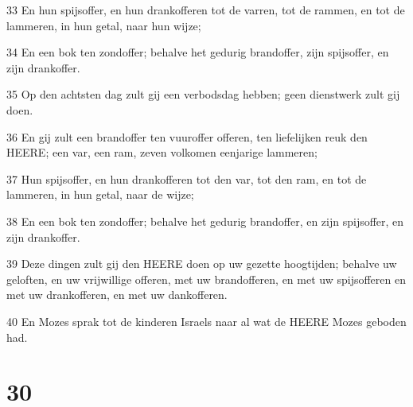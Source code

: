 \par 33 En hun spijsoffer, en hun drankofferen tot de varren, tot de rammen, en tot de lammeren, in hun getal, naar hun wijze;
\par 34 En een bok ten zondoffer; behalve het gedurig brandoffer, zijn spijsoffer, en zijn drankoffer.
\par 35 Op den achtsten dag zult gij een verbodsdag hebben; geen dienstwerk zult gij doen.
\par 36 En gij zult een brandoffer ten vuuroffer offeren, ten liefelijken reuk den HEERE; een var, een ram, zeven volkomen eenjarige lammeren;
\par 37 Hun spijsoffer, en hun drankofferen tot den var, tot den ram, en tot de lammeren, in hun getal, naar de wijze;
\par 38 En een bok ten zondoffer; behalve het gedurig brandoffer, en zijn spijsoffer, en zijn drankoffer.
\par 39 Deze dingen zult gij den HEERE doen op uw gezette hoogtijden; behalve uw geloften, en uw vrijwillige offeren, met uw brandofferen, en met uw spijsofferen en met uw drankofferen, en met uw dankofferen.
\par 40 En Mozes sprak tot de kinderen Israels naar al wat de HEERE Mozes geboden had.

\chapter{30}

